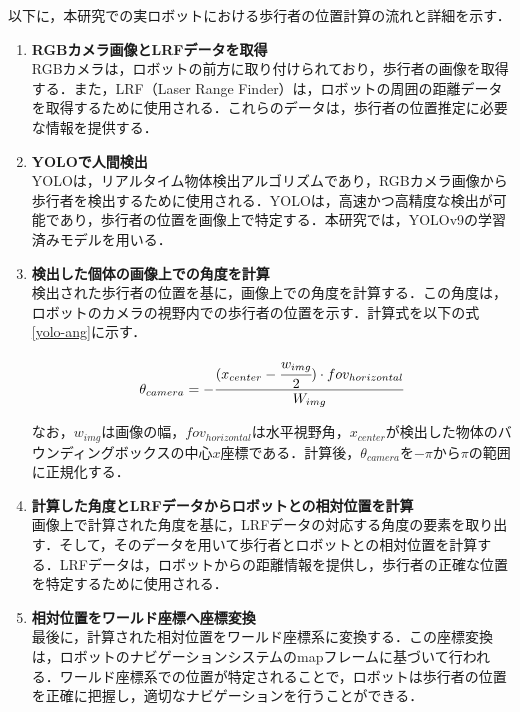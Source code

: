 \newpage

以下に，本研究での実ロボットにおける歩行者の位置計算の流れと詳細を示す．

\begin{enumerate}
  \item \textbf{RGBカメラ画像とLRFデータを取得} \\
  RGBカメラは，ロボットの前方に取り付けられており，歩行者の画像を取得する．また，LRF（Laser Range Finder）は，ロボットの周囲の距離データを取得するために使用される．これらのデータは，歩行者の位置推定に必要な情報を提供する．

  \item \textbf{YOLOで人間検出} \\
  YOLO\cite{redmon2016you-yolo}は，リアルタイム物体検出アルゴリズムであり，RGBカメラ画像から歩行者を検出するために使用される．YOLOは，高速かつ高精度な検出が可能であり，歩行者の位置を画像上で特定する．本研究では，YOLOv9\cite{wang2025yolov9}の学習済みモデルを用いる．

  \item \textbf{検出した個体の画像上での角度を計算} \\
  検出された歩行者の位置を基に，画像上での角度を計算する．この角度は，ロボットのカメラの視野内での歩行者の位置を示す．計算式を以下の式\eqref{yolo-ang}に示す．

  \begin{equation}
    \theta_{camera} = - \cfrac{(x_{center} - \cfrac{w_{img}}{2}) \cdot fov_{horizontal}}{W_{img}} \label{yolo-ang}
  \end{equation}

  なお，$w_{img}$は画像の幅，$fov_{horizontal}$は水平視野角，$x_{center}$が検出した物体のバウンディングボックスの中心$x$座標である．計算後，$\theta_{camera}$を$-\pi \text{から} \pi$の範囲に正規化する．

  \item \textbf{計算した角度とLRFデータからロボットとの相対位置を計算} \\
  画像上で計算された角度を基に，LRFデータの対応する角度の要素を取り出す．そして，そのデータを用いて歩行者とロボットとの相対位置を計算する．LRFデータは，ロボットからの距離情報を提供し，歩行者の正確な位置を特定するために使用される．

  \item \textbf{相対位置をワールド座標へ座標変換} \\
  最後に，計算された相対位置をワールド座標系に変換する．この座標変換は，ロボットのナビゲーションシステムのmapフレームに基づいて行われる．ワールド座標系での位置が特定されることで，ロボットは歩行者の位置を正確に把握し，適切なナビゲーションを行うことができる．
\end{enumerate}

